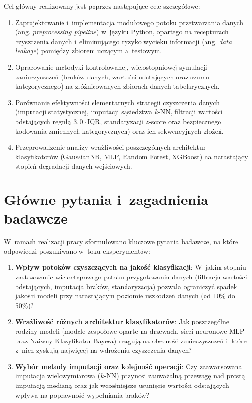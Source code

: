 Cel główny realizowany jest poprzez następujące cele szczegółowe:
\begin{enumerate}
    \item Zaprojektowanie i~implementacja modułowego potoku przetwarzania danych (ang. \textit{preprocessing pipeline}) w~języku Python, opartego na recepturach czyszczenia danych \cite{Walker2021} i~eliminującego ryzyko wycieku informacji (ang. \textit{data leakage}) pomiędzy zbiorem uczącym a~testowym.
    \item Opracowanie metodyki kontrolowanej, wielostopniowej symulacji zanieczyszczeń (braków danych, wartości odstających oraz szumu kategorycznego) na zróżnicowanych zbiorach danych tabelarycznych.
    \item Porównanie efektywności elementarnych strategii czyszczenia danych (imputacji statystycznej, imputacji sąsiedztwa $k$-NN, filtracji wartości odstających regułą $3{,}0 \cdot \mathrm{IQR}$, standaryzacji $z$-score oraz bezpiecznego kodowania zmiennych kategorycznych) oraz ich sekwencyjnych złożeń.
    \item Przeprowadzenie analizy wrażliwości poszczególnych architektur klasyfikatorów (GaussianNB, MLP, Random Forest, XGBoost) na narastający stopień degradacji danych wejściowych.
\end{enumerate}

\section{Główne pytania i~zagadnienia badawcze}
W~ramach realizacji pracy sformułowano kluczowe pytania badawcze, na które odpowiedzi poszukiwano w~toku eksperymentów:
\begin{enumerate}
    \item \textbf{Wpływ potoków czyszczących na jakość klasyfikacji}: W~jakim stopniu zastosowanie wieloetapowego potoku przygotowania danych (filtracja wartości odstających, imputacja braków, standaryzacja) pozwala ograniczyć spadek jakości modeli przy narastającym poziomie uszkodzeń danych (od 10\% do 50\%)?
    \item \textbf{Wrażliwość różnych architektur klasyfikatorów}: Jak poszczególne rodziny modeli (modele zespołowe oparte na drzewach, sieci neuronowe MLP oraz Naiwny Klasyfikator Bayesa) reagują na obecność zanieczyszczeń i~które z~nich zyskują najwięcej na wdrożeniu czyszczenia danych?
    \item \textbf{Wybór metody imputacji oraz kolejność operacji}: Czy zaawansowana imputacja wielowymiarowa ($k$-NN) przynosi zauważalną przewagę nad prostą imputacją medianą oraz jak wcześniejsze usunięcie wartości odstających wpływa na poprawność wypełniania braków?
\end{enumerate}

